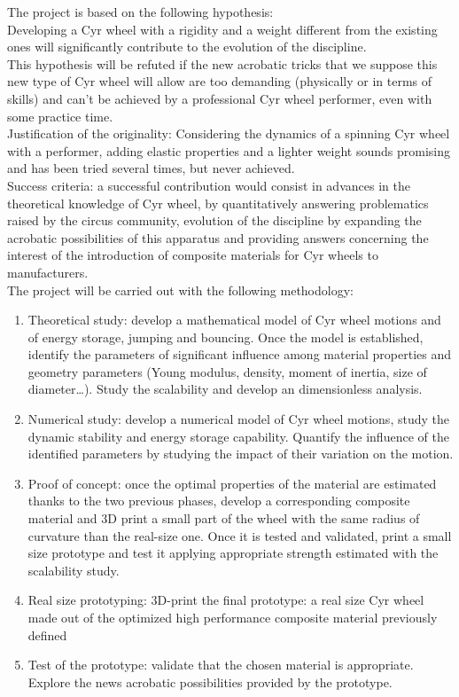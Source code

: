 The project is based on the following hypothesis:\\
Developing a Cyr wheel with a rigidity and a weight different from the existing ones will significantly contribute to the evolution of the discipline.\\
This hypothesis will be refuted if the new acrobatic tricks that we suppose this new type of Cyr wheel will allow are too demanding (physically or in terms of skills) and can’t be achieved by a professional Cyr wheel performer, even with some practice time.\\

Justification of the originality: Considering the dynamics of a spinning Cyr wheel with a performer, adding elastic properties and a lighter weight sounds promising and has been tried several times, but never achieved.\\
Success criteria: a successful contribution would consist in advances in the theoretical knowledge of Cyr wheel, by quantitatively answering problematics raised by the circus community, evolution of the discipline by expanding the acrobatic possibilities of this apparatus and providing answers concerning the interest of the introduction of composite materials for Cyr wheels to manufacturers.\\

The project will be carried out with the following methodology:

\begin{enumerate}
\item Theoretical study:
develop a mathematical model of Cyr wheel motions and of energy storage, jumping and bouncing. Once the model is established, identify the parameters of significant influence among material properties and geometry parameters (Young modulus, density, moment of inertia, size of diameter…). Study the scalability and develop an dimensionless analysis.

\item Numerical study:
develop a numerical model of Cyr wheel motions, study the dynamic stability and energy storage capability. Quantify the influence of the identified parameters by studying the impact of their variation on the motion.

\item Proof of concept:
once the optimal properties of the material are estimated thanks to the two previous phases, develop a corresponding composite material and 3D print a small part of the wheel with the same radius of curvature than the real-size one. Once it is tested and validated, print a small size prototype and test it applying appropriate strength estimated with the scalability study.

\item Real size prototyping:
3D-print the final prototype: a real size Cyr wheel made out of the optimized high performance composite material previously defined

\item Test of the prototype:
validate that the chosen material is appropriate.
Explore the news acrobatic possibilities provided by the prototype.

\end{enumerate}


